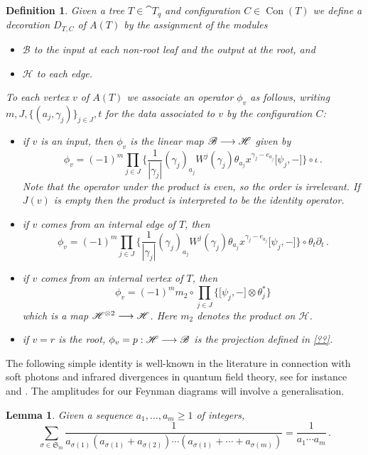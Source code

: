 \documentclass[english,letter paper,12pt,leqno]{article}
\newtheorem{lemma}[theorem]{Lemma}
\theoremstyle{example}
\newtheorem{definition}[theorem]{Definition}
\numberwithin{equation}{section}
\def\be{\begin{equation}}
\def\ee{\end{equation}}
\begin{document}
\begin{definition} Given a tree $T \in \cat{T}_q$ and configuration $C \in \operatorname{Con}(T)$ we define a decoration $D_{T,C}$ of $A(T)$ by the assignment of the modules
\begin{itemize}
\item $\mathscr{B}$ to the input at each non-root leaf and the output at the root, and
\item $\mathscr{H}$ to each edge.
\end{itemize}
To each vertex $v$ of $A(T)$ we associate an operator $\phi_v$ as follows, writing $m, J, \{ (a_j, \gamma_j) \}_{j \in J}, t$ for the data associated to $v$ by the configuration $C$:
\begin{itemize}
\item if $v$ is an input, then $\phi_v$ is the linear map $\mathscr{B} \longrightarrow \mathscr{H}$ given by
\be\label{eq:int_input}
\phi_v = (-1)^m \prod_{j \in J}\Big\{ \frac{1}{|\gamma_j|}(\gamma_j)_{a_j} W^j( \gamma_j)  \theta_{a_j} x^{\gamma_j - e_{a_j}} \big[ \psi_j, - \big] \Big\} \circ \iota\,.
\ee
Note that the operator under the product is even, so the order is irrelevant. If $J(v)$ is empty then the product is interpreted to be the identity operator.
\item if $v$ comes from an internal edge of $T$, then
\be\label{eq:int_intedge}
\phi_v = (-1)^m \prod_{j \in J} \Big\{ \frac{1}{|\gamma_j|}(\gamma_j)_{a_j} W^j( \gamma_j)  \theta_{a_j} x^{\gamma_j - e_{a_j}} \big[ \psi_j, - \big] \Big\} \circ \theta_t \partial_t\,.
\ee
\item if $v$ comes from an internal vertex of $T$, then
\be\label{eq:int_intvert}
\phi_v = (-1)^m m_2 \circ \prod_{j \in J} \Big\{ \big[ \psi_j, - \big] \otimes \theta_j^* \Big\}
\ee
which is a map $\mathscr{H}^{\otimes 2} \longrightarrow \mathscr{H}$. Here $m_2$ denotes the product on $\mathscr{H}$.
\item if $v = r$ is the root, $\phi_v = p: \mathscr{H} \longrightarrow \mathscr{B}$ is the projection defined in \eqref{??}.
\end{itemize}
\end{definition}

The following simple identity is well-known in the literature in connection with soft photons and infrared divergences in quantum field theory, see for instance \cite[Ch 13]{weinberg} and \cite[p.204]{ps}. The amplitudes for our Feynman diagrams will involve a generalisation.

\begin{lemma} Given a sequence $a_1,\ldots,a_m \ge 1$ of integers,
\be
\sum_{\sigma \in \mathfrak{S}_m} \frac{1}{a_{\sigma(1)}(a_{\sigma(1)} + a_{\sigma(2)}) \cdots (a_{\sigma(1)} + \cdots + a_{\sigma(m)})} = \frac{1}{a_1 \cdots a_m}\,.
\ee
\end{lemma}
\end{document}
